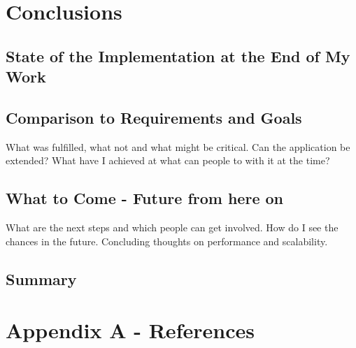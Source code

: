 \documentclass[11p]{scrartcl}
\begin{document}
\section{Conclusions}
\label{sec:conclusions}
\subsection{State of the Implementation at the End of My Work}
\subsection{Comparison to Requirements and Goals}
What was fulfilled, what not and what might be critical. Can the application be extended? What have I achieved at what can people to with it at the time?\\
\subsection{What to Come - Future from here on}
What are the next steps and which people can get involved. How do I see the chances in the future. Concluding thoughts on performance and scalability.
\subsection{Summary}


\section*{Appendix A - References}


\end{document}

